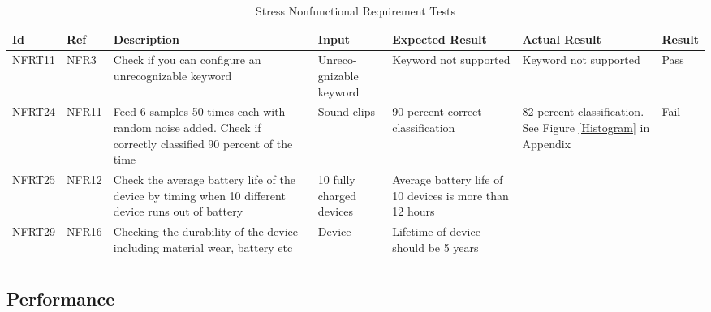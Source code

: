\documentclass[12pt, titlepage]{article}
\begin{document}
\begin{longtable}{|p{1.4cm}|p{1.4cm}|p{3cm}|p{1.5cm}|p{2.5cm}|p{2cm}|p{1.2cm}|}

  \endfirsthead
  \endhead
  \hline
  \textbf{Id} & \textbf{Ref} & \textbf{Description}                                                         & \textbf{Input}                                    & \textbf{Expected Result}    & \textbf{Actual Result}                          & \textbf{Result}                                     \\ \hline
  NFRT11        & NFR3          & Check if you can configure an unrecognizable keyword              & Unreco-gnizable keyword                          & Keyword not supported                      & Keyword not supported                         & {\color[HTML]{32CB00} Pass}                         \\ \hline
  NFRT24        & NFR11         & Feed 6 samples 50 times each with random noise added. Check if correctly classified 90 percent of the time           & Sound clips   & 90 percent correct classification        & 82 percent classification. See Figure \ref*{Histogram} in Appendix     & {\color[HTML]{FE0000} Fail}                           \\ \hline
  NFRT25        & NFR12         & Check the average battery life of the device by timing when 10 different device runs out of battery  & 10 fully charged devices   & Average battery life of 10 devices is more than 12 hours                   &                     &\cellcolor[HTML]{FFFFFF}{\color[HTML]{F8A102} TBD}                          \\ \hline
  NFRT29        & NFR16         & Checking the durability of the device including material wear, battery etc & Device  & Lifetime of device should be 5 years&          & \cellcolor[HTML]{FFFFFF}{\color[HTML]{F8A102} TBD}                        \\ \hline
  \caption{Stress Nonfunctional Requirement Tests}
  \label{stressNonfunctionalRequirementTests}
\end{longtable}
\subsection{Performance}
\end{document}
